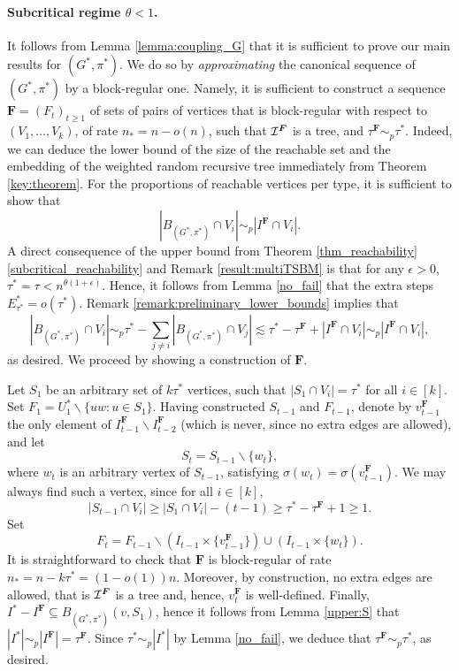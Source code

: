 \documentclass[11pt]{article}
\numberwithin{equation}{section}
\theoremstyle{definition}
\newcommand\cI{{\cal{I}}}
\begin{document}
\paragraph{Subcritical regime $\theta < 1$.} It follows from Lemma \ref{lemma:coupling_G} that it is sufficient to prove our main results for $(G^*,\pi^*)$. We do so by \emph{approximating} the canonical sequence of $(G^*,\pi^*)$ by a block-regular one. Namely, it is sufficient to construct a sequence $\boldsymbol{F} = (F_t)_{t\geq 1}$ of sets of pairs of vertices that is block-regular with respect to $(V_1,\ldots,V_k)$, of rate $n_* = n-o(n)$, such that $\cI^{\boldsymbol{F}}$ is a tree, and $\tau^{\boldsymbol{F}} \sim_p \tau^*$. Indeed, we can deduce the lower bound of the size of the reachable set and the embedding of the weighted random recursive tree immediately from Theorem \ref{key:theorem}. For the proportions of reachable vertices per type, it is sufficient to show that
$$ |B_{(G^*,\pi^*)} \cap V_i|  \sim_p |I^{\boldsymbol{F}}\cap V_i|. $$
A direct consequence of the upper bound from Theorem \ref{thm_reachability}\ref{subcritical_reachability} and Remark \ref{result:multiTSBM} is that for any $\epsilon>0$, $\tau^* = \tau < n^{\theta(1+\epsilon)}$. Hence, it follows from Lemma \ref{no_fail} that the extra steps $E^*_{\tau^*}=o(\tau^*)$. Remark \ref{remark:preliminary_lower_bounds} implies that
$$ |B_{(G^*,\pi^*)} \cap V_i| \sim_p \tau^* - \sum_{j\neq i} |B_{(G^*,\pi^*)} \cap V_j| \lesssim \tau^* - \tau^{\boldsymbol{F}} + |I^{\boldsymbol{F}}\cap V_i| \sim_p |I^{\boldsymbol{F}}\cap V_i|,$$
as desired. We proceed by showing a construction of $\boldsymbol{F}$.

Let $S_1$ be an arbitrary set of $k \tau^*$ vertices, such that $|S_1 \cap V_i| = \tau^*$ for all $i\in [k]$. Set $F_1 = U^*_1 \backslash \{uw: u \in S_1\}$. Having constructed $S_{t-1}$ and $F_{t-1}$, denote by $v^{\boldsymbol{F}}_{t-1}$ the only element of $I^{\boldsymbol{F}}_{t-1}\backslash I_{t-2}^{\boldsymbol{F}}$ (which is never, since no extra edges are allowed), and let
$$ S_t = S_{t-1} \backslash \{w_t \},$$
where $w_t$ is an arbitrary vertex of $S_{t-1}$, satisfying $\sigma(w_t) = \sigma(v^{\boldsymbol{F}}_{t-1})$. We may always find such a vertex, since for all $i\in[k]$, 
$$|S_{t-1}\cap V_i| \geq |S_1 \cap V_i| - (t-1) \geq \tau^* - \tau^{\boldsymbol{F}} + 1 \geq 1.$$ 
Set
\begin{equation}
\label{embed_sequence}
F_t = F_{t-1} \backslash (I_{t-1}\times \{v^{\boldsymbol{F}}_{t-1}\}) \cup (I_{t-1}\times \{w_t\}).
\end{equation}
It is straightforward to check that $\boldsymbol{F}$ is block-regular of rate $n_* = n- k\tau^* = (1-o(1))n$. Moreover, by construction, no extra edges are allowed, that is $\cI^{\boldsymbol{F}}$ is a tree and, hence, $v^{\boldsymbol{F}}_t$ is well-defined. Finally, $I^* - I^{\boldsymbol{F}} \subseteq B_{(G^*,\pi^*)}(v,S_1)$, hence it follows from Lemma \ref{upper:S} that $|I^*| \sim_p |I^{\boldsymbol{F}}| = \tau^{\boldsymbol{F}}$. Since $\tau^* \sim_p |I^*|$ by Lemma \ref{no_fail}, we deduce that $\tau^{\boldsymbol{F}} \sim_p \tau^*$, as desired. %
\end{document}
